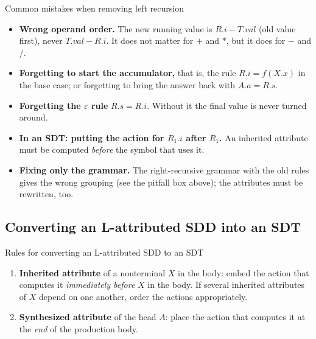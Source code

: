 \documentclass[11pt,a4paper]{article}
\begin{document}
\begin{pitfallbox}{Common mistakes when removing left recursion}
\begin{itemize}[nosep]
\item \textbf{Wrong operand order.} The new running value is $R.i - T.val$ (old value first), never $T.val - R.i$. It does not matter for $+$ and $*$, but it does for $-$ and $/$.
\item \textbf{Forgetting to start the accumulator,} that is, the rule $R.i=f(X.x)$ in the base case; or forgetting to bring the answer back with $A.a=R.s$.
\item \textbf{Forgetting the $\varepsilon$ rule} $R.s=R.i$. Without it the final value is never turned around.
\item \textbf{In an SDT: putting the action for $R_1.i$ after $R_1$.} An inherited attribute must be computed \emph{before} the symbol that uses it.
\item \textbf{Fixing only the grammar.} The right-recursive grammar with the old rules gives the wrong grouping (see the pitfall box above); the attributes must be rewritten, too.
\end{itemize}
\end{pitfallbox}

\subsection{Converting an L-attributed SDD into an SDT}
\label{sec:lattr}
\begin{defbox}{Rules for converting an L-attributed SDD to an SDT}
\begin{enumerate}[nosep]
\item \textbf{Inherited attribute} of a nonterminal $X$ in the body: embed the action that computes it \emph{immediately before} $X$ in the body. If several inherited attributes of $X$ depend on one another, order the actions appropriately.
\item \textbf{Synthesized attribute} of the head $A$: place the action that computes it at the \emph{end} of the production body.
\end{enumerate}
\end{defbox}
\end{document}
